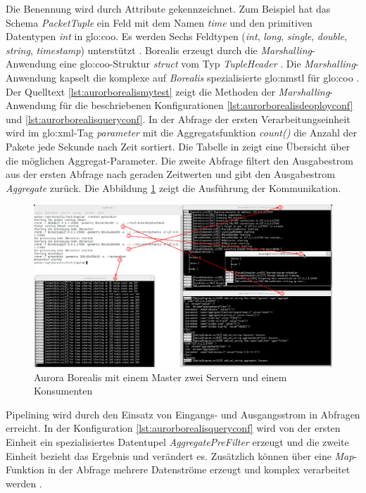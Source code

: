 Die Benennung wird durch Attribute gekennzeichnet. Zum Beispiel hat das Schema \textit{PacketTuple} ein Feld mit dem Namen \textit{time} und den primitiven Datentypen \textit{int} in \gls{glo:coo}. Es werden Sechs Feldtypen (\textit{int}, \textit{long}, \textit{single}, \textit{double}, \textit{string}, \textit{timestamp}) unterstützt . Borealis erzeugt durch die \textit{Marshalling}-Anwendung eine \gls{glo:coo}-Struktur \textit{struct} vom Typ \textit{TupleHeader} . Die \textit{Marshalling}-Anwendung kapselt die komplexe auf \textit{Borealis} spezialisierte \gls{glo:nmstl} für \gls{glo:coo} . Der Quelltext \ref{lst:aurorborealismytest} zeigt die Methoden der \textit{Marshalling}-Anwendung für die beschriebenen Konfigurationen \ref{lst:aurorborealisdeoployconf} und \ref{lst:aurorborealisqueryconf}. In der Abfrage der ersten Verarbeitungseinheit wird im \gls{glo:xml}-Tag \textit{parameter} mit die Aggregatsfunktion \textit{count()} die Anzahl der Pakete jede Sekunde nach Zeit sortiert. Die Tabelle in  zeigt eine Übersicht über die möglichen Aggregat-Parameter. Die zweite Abfrage filtert den Ausgabestrom aus der ersten Abfrage nach geraden Zeitwerten und gibt den Ausgabestrom \textit{Aggregate} zurück. Die Abbildung \ref{fig:aurborinaction} zeigt die Ausführung der Kommunikation.

\begin{figure}[htb!]
\centering
\includegraphics[width=1.0\textwidth]{bilder/auroraborealisinaction.png}
\caption{Aurora Borealis mit einem Master zwei Servern und einem Konsumenten
\label{fig:aurborinaction}}
\end{figure}

Pipelining wird durch den Einsatz von Eingangs- und Ausgangsstrom in Abfragen erreicht. In der Konfiguration \ref{lst:aurorborealisqueryconf} wird von der ersten Einheit ein spezialisiertes Datentupel \textit{AggregatePreFilter} erzeugt und die zweite Einheit bezieht das Ergebnis und verändert es. Zusätzlich können über eine \textit{Map}-Funktion in der Abfrage mehrere Datenströme erzeugt und komplex verarbeitet werden .

